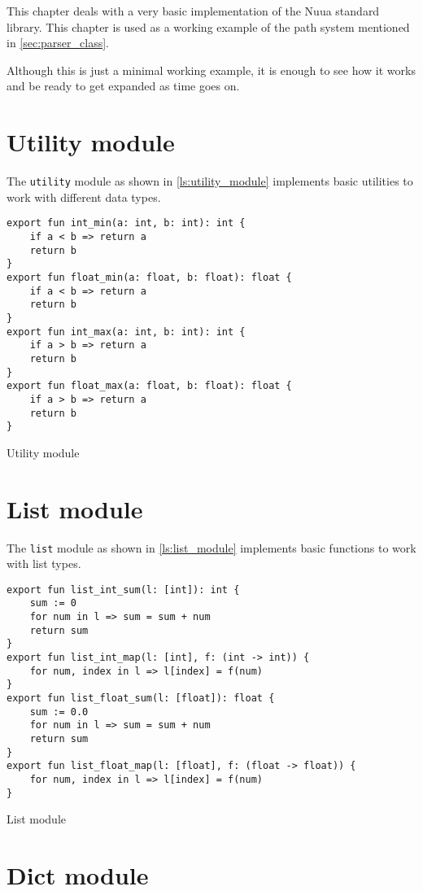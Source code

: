 This chapter deals with a very basic implementation of the Nuua standard library. This chapter is used as a working example of the path system mentioned in \autoref{sec:parser_class}.

Although this is just a minimal working example, it is enough to see how it works
and be ready to get expanded as time goes on.

\section{Utility module}

The \texttt{utility} module as shown in \autoref{ls:utility_module} implements basic utilities to work with different data types.

\begin{listing}[H]
\begin{verbatim}
export fun int_min(a: int, b: int): int {
    if a < b => return a
    return b
}
export fun float_min(a: float, b: float): float {
    if a < b => return a
    return b
}
export fun int_max(a: int, b: int): int {
    if a > b => return a
    return b
}
export fun float_max(a: float, b: float): float {
    if a > b => return a
    return b
}
\end{verbatim}
\caption{Utility module}
\label{ls:utility_module}
\end{listing}

\section{List module}

The \texttt{list} module as shown in \autoref{ls:list_module} implements basic functions to work with list types.

\begin{listing}[H]
\begin{verbatim}
export fun list_int_sum(l: [int]): int {
    sum := 0
    for num in l => sum = sum + num
    return sum
}
export fun list_int_map(l: [int], f: (int -> int)) {
    for num, index in l => l[index] = f(num)
}
export fun list_float_sum(l: [float]): float {
    sum := 0.0
    for num in l => sum = sum + num
    return sum
}
export fun list_float_map(l: [float], f: (float -> float)) {
    for num, index in l => l[index] = f(num)
}
\end{verbatim}
\caption{List module}
\label{ls:list_module}
\end{listing}

\section{Dict module}

